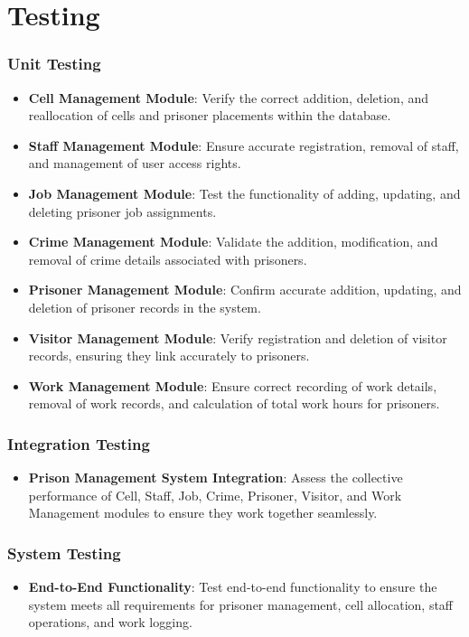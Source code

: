 \chapter{Testing}

\subsection{Unit Testing}
\begin{itemize}
    \item \textbf{Cell Management Module}: Verify the correct addition, deletion, and reallocation of cells and prisoner placements within the database.
    \item \textbf{Staff Management Module}: Ensure accurate registration, removal of staff, and management of user access rights.
    \item \textbf{Job Management Module}: Test the functionality of adding, updating, and deleting prisoner job assignments.
    \item \textbf{Crime Management Module}: Validate the addition, modification, and removal of crime details associated with prisoners.
    \item \textbf{Prisoner Management Module}: Confirm accurate addition, updating, and deletion of prisoner records in the system.
    \item \textbf{Visitor Management Module}: Verify registration and deletion of visitor records, ensuring they link accurately to prisoners.
    \item \textbf{Work Management Module}: Ensure correct recording of work details, removal of work records, and calculation of total work hours for prisoners.
\end{itemize}

\subsection{Integration Testing}
\begin{itemize}
    \item \textbf{Prison Management System Integration}: Assess the collective performance of Cell, Staff, Job, Crime, Prisoner, Visitor, and Work Management modules to ensure they work together seamlessly.
\end{itemize}

\subsection{System Testing}
\begin{itemize}
    \item \textbf{End-to-End Functionality}: Test end-to-end functionality to ensure the system meets all requirements for prisoner management, cell allocation, staff operations, and work logging.
\end{itemize}

